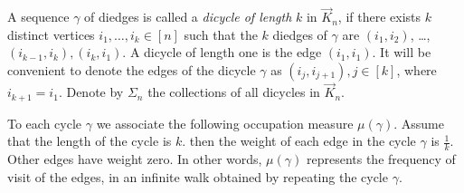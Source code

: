 \documentclass{amsart}
\newcommand{\kdigraph}{\vec{K}}
\newcommand{\0}{\mathbf{0}}
\newcommand{\1}{\mathbf{1}}
\theoremstyle{remark}
\numberwithin{equation}{section} %
\begin{document}
A sequence $\gamma$ of diedges is called a {\em dicycle  of length} $k$ in $\kdigraph_n$, if
 there exists $k$ distinct vertices $i_1,\ldots,i_k\in [n]$ such that the $k$ diedges of $\gamma$ are  $(i_1,i_2)$, \ldots, $(i_{k-1},i_k),(i_k,i_1)$.
 A dicycle of length one is the edge $(i_1,i_1)$.  It will be convenient to denote the edges of the dicycle $\gamma$ as $(i_j,i_{j+1}), j\in [k]$,
 where $i_{k+1}=i_1$.  Denote by $\Sigma_n$ the collections of all dicycles in $\kdigraph_n$.
 
 To each cycle $\gamma$ we associate the following occupation measure $\mu(\gamma)$.  Assume that the length of the cycle is $k$.
 then the weight of each edge in the cycle $\gamma$ is $\frac{1}{k}$.  Other edges have weight zero. In other words, $\mu(\gamma)$ represents the frequency
of visit of the edges, in an infinite walk obtained by repeating the cycle $\gamma$. %
\end{document}
